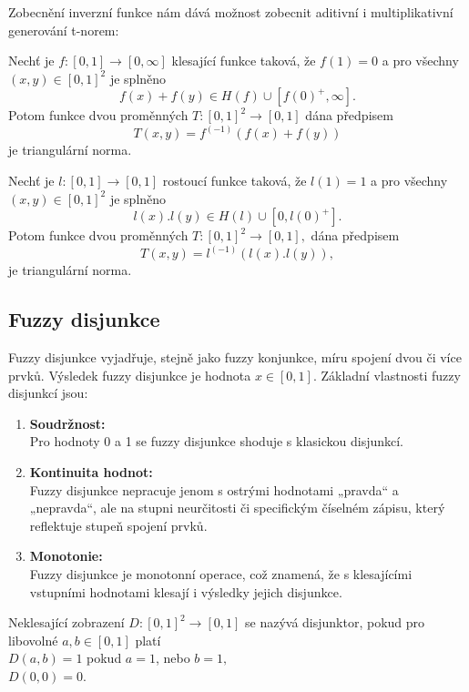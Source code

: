  Zobecn\v en\'i inverzn\'i funkce n\'am d\'av\'a mo\v znost zobecnit aditivn\'i i multiplikativn\'i generov\'an\'i t-norem:
\begin{sentence} \cite{KMP}
    Nech\v t je $f:[0,1] \rightarrow [0,\infty]$ klesající funkce
    taková, že $f(1)=0$ a pro všechny $(x,y) \in [0,1]^2$  je splněno
    $$f(x)+f(y) \in H(f) \cup [f(0)^+,\infty].$$
    Potom funkce dvou proměnných $T:[0,1]^2 \rightarrow [0,1]$ dána předpisem
    $$T(x,y)=f^{(-1)}(f(x)+f(y))$$
    je triangulární norma.
\end{sentence}
\begin{sentence}\cite{KMP}
    Nech\v t je $l:[0,1] \rightarrow [0,1]$ rostoucí funkce
    taková, že $l(1)=1$ a pro všechny $(x,y) \in [0,1]^2$  je splněno
    $$l(x).l(y) \in H(l) \cup [0,l(0)^+].$$
    Potom funkce dvou proměnných $T:[0,1]^2 \rightarrow [0,1],$ dána předpisem
    $$T(x,y)=l^{(-1)}(l(x).l(y)),$$
    je triangulární norma.
\end{sentence}


\subsection{Fuzzy disjunkce} 
Fuzzy disjunkce vyjadřuje, stejně jako fuzzy konjunkce, míru spojení dvou či více prvk\r u. Výsledek fuzzy disjunkce je hodnota $x \in [0,1].$ 
Základní vlastnosti fuzzy disjunkcí jsou:
\begin{enumerate}
    \item \textbf{Soudržnost:}\\
    Pro hodnoty 0 a 1 se fuzzy disjunkce shoduje s klasickou disjunkcí.
    \item \textbf{Kontinuita hodnot:}\\
    Fuzzy disjunkce nepracuje jenom s  ostrými hodnotami „pravda“ a „nepravda“, ale na stupni neurčitosti či specifickým číselném zápisu, který reflektuje stupeň spojení prvk\r u.
   \item \textbf{Monotonie:}\\
    Fuzzy disjunkce je monotonní operace, což znamená, že s klesajícími vstupními hodnotami klesají i výsledky jejich disjunkce.
\end{enumerate}

\begin{definition}
    \cite{Kolo}
    Neklesající zobrazení $D: [0,1]^2 \rightarrow [0,1]$ se nazývá disjunktor, pokud pro libovolné $a, b \in [0,1]$ platí\\ $D(a,b) = 1$ pokud  $a = 1$, nebo  $b = 1,$\\
    $D(0,0) = 0.$
\end{definition}

